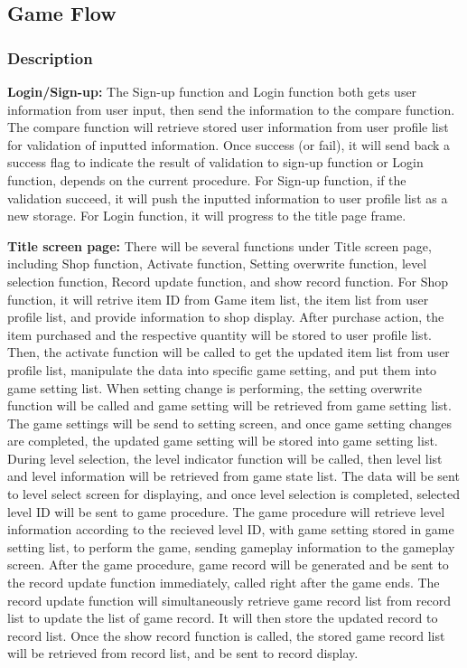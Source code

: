 \documentclass[11pt]{article}
\begin{document}
\subsection{Game Flow}
\subsubsection{Description}
\textbf{Login/Sign-up:} The Sign-up function and Login function both gets user information from user input, then send the information to the compare function. The compare function will retrieve stored user information from user profile list for validation of inputted information. Once success (or fail), it will send back a success flag to indicate the result of validation to sign-up function or Login function, depends on the current procedure. For Sign-up function, if the validation succeed, it will push the inputted information to user profile list as a new storage. For Login function, it will progress to the title page frame.

\textbf{Title screen page:} There will be several functions under Title screen page, including Shop function, Activate function, Setting overwrite function, level selection function, Record update function, and show record function. For Shop function, it will retrive item ID from Game item list, the item list from user profile list, and provide information to shop display. After purchase action, the item purchased and the respective quantity will be stored to user profile list. Then, the activate function will be called to get the updated item list from user profile list, manipulate the data into specific game setting, and put them into game setting list. When setting change is performing, the setting overwrite function will be called and game setting will be retrieved from game setting list. The game settings will be send to setting screen, and once game setting changes are completed, the updated game setting will be stored into game setting list. During level selection, the level indicator function will be called, then level list and level information will be retrieved from game state list. The data will be sent to level select screen for displaying, and once level selection is completed, selected level ID will be sent to game procedure. The game procedure will retrieve level information according to the recieved level ID, with game setting stored in game setting list, to perform the game, sending gameplay information to the gameplay screen. After the game procedure, game record will be generated and be sent to the record update function immediately, called right after the game ends. The record update function will simultaneously retrieve game record list from record list to update the list of game record. It will then store the updated record to record list. Once the show record function is called, the stored game record list will be retrieved from record list, and be sent to record display.
\end{document}
